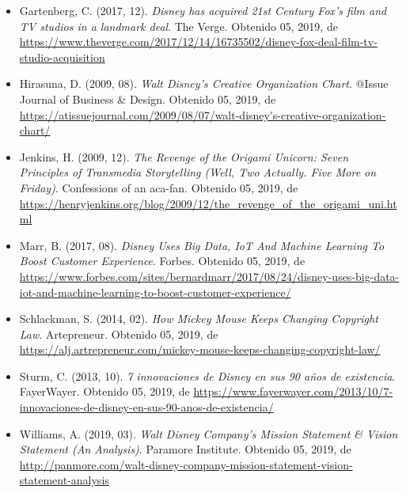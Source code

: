 \begin{itemize}
\item
Gartenberg, C. (2017, 12). \textit{Disney has acquired 21st Century Fox’s film and TV studios in a landmark deal}. The Verge. Obtenido 05, 2019, de \url{https://www.theverge.com/2017/12/14/16735502/disney-fox-deal-film-tv-studio-acquisition}

\item
Hirasuna, D. (2009, 08). \textit{Walt Disney’s Creative Organization Chart}. @Issue Journal of Business \& Design. Obtenido 05, 2019, de \url{https://atissuejournal.com/2009/08/07/walt-disney's-creative-organization-chart/}

\item
Jenkins, H. (2009, 12). \textit{The Revenge of the Origami Unicorn: Seven Principles of Transmedia Storytelling (Well, Two Actually. Five More on Friday)}. Confessions of an aca-fan. Obtenido 05, 2019, de \url{https://henryjenkins.org/blog/2009/12/the_revenge_of_the_origami_uni.html}

\item
Marr, B. (2017, 08). \textit{Disney Uses Big Data, IoT And Machine Learning To Boost Customer Experience}. Forbes. Obtenido 05, 2019, de \url{https://www.forbes.com/sites/bernardmarr/2017/08/24/disney-uses-big-data-iot-and-machine-learning-to-boost-customer-experience/}


\item
Schlackman, S. (2014, 02). \textit{How Mickey Mouse Keeps Changing Copyright Law}. Artepreneur. Obtenido 05, 2019, de \url{https://alj.artrepreneur.com/mickey-mouse-keeps-changing-copyright-law/}

\item
Sturm, C. (2013, 10). \textit{7 innovaciones de Disney en sus 90 años de existencia}. FayerWayer. Obtenido 05, 2019, de \url{https://www.fayerwayer.com/2013/10/7-innovaciones-de-disney-en-sus-90-anos-de-existencia/}

\item
Williams, A. (2019, 03). \textit{Walt Disney Company’s Mission Statement \& Vision Statement (An Analysis)}. Paramore Institute. Obtenido 05, 2019, de \url{http://panmore.com/walt-disney-company-mission-statement-vision-statement-analysis}


\end{itemize}